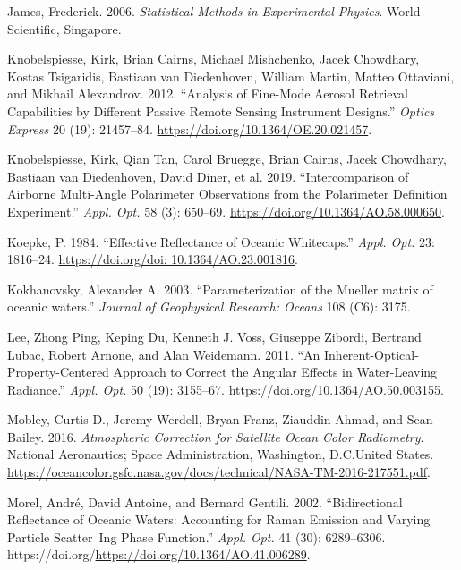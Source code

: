 \documentclass[
  letterpaper,
  open=any]{scrbook}
\newlength{\cslhangindent}
\newenvironment{CSLReferences}[2] %
 {\begin{list}{}{%
  \setlength{\itemindent}{0pt}
  \setlength{\leftmargin}{0pt}
  \setlength{\parsep}{0pt}
  \ifodd #1
   \setlength{\leftmargin}{\cslhangindent}
   \setlength{\itemindent}{-1\cslhangindent}
  \fi
  \setlength{\itemsep}{#2\baselineskip}}}
 {\end{list}}
\begin{document}
\begin{CSLReferences}{1}{0}
James, Frederick. 2006. \emph{Statistical Methods in Experimental
Physics}. World Scientific, Singapore.

Knobelspiesse, Kirk, Brian Cairns, Michael Mishchenko, Jacek Chowdhary,
Kostas Tsigaridis, Bastiaan van Diedenhoven, William Martin, Matteo
Ottaviani, and Mikhail Alexandrov. 2012. {``Analysis of Fine-Mode
Aerosol Retrieval Capabilities by Different Passive Remote Sensing
Instrument Designs.''} \emph{Optics Express} 20 (19): 21457--84.
\url{https://doi.org/10.1364/OE.20.021457}.

Knobelspiesse, Kirk, Qian Tan, Carol Bruegge, Brian Cairns, Jacek
Chowdhary, Bastiaan van Diedenhoven, David Diner, et al. 2019.
{``Intercomparison of Airborne Multi-Angle Polarimeter Observations from
the Polarimeter Definition Experiment.''} \emph{Appl. Opt.} 58 (3):
650--69. \url{https://doi.org/10.1364/AO.58.000650}.

Koepke, P. 1984. {``Effective Reflectance of Oceanic Whitecaps.''}
\emph{Appl. Opt.} 23: 1816--24.
\href{https://doi.org/doi:\%2010.1364/AO.23.001816}{https://doi.org/doi:
10.1364/AO.23.001816}.

Kokhanovsky, Alexander A. 2003. {``{Parameterization of the Mueller
matrix of oceanic waters}.''} \emph{Journal of Geophysical Research:
Oceans} 108 (C6): 3175.

Lee, Zhong Ping, Keping Du, Kenneth J. Voss, Giuseppe Zibordi, Bertrand
Lubac, Robert Arnone, and Alan Weidemann. 2011. {``An
Inherent-Optical-Property-Centered Approach to Correct the Angular
Effects in Water-Leaving Radiance.''} \emph{Appl. Opt.} 50 (19):
3155--67. \url{https://doi.org/10.1364/AO.50.003155}.

Mobley, Curtis D., Jeremy Werdell, Bryan Franz, Ziauddin Ahmad, and Sean
Bailey. 2016. \emph{Atmospheric Correction for Satellite Ocean Color
Radiometry}. National Aeronautics; Space Administration, Washington,
D.C.United States.
\url{https://oceancolor.gsfc.nasa.gov/docs/technical/NASA-TM-2016-217551.pdf}.

Morel, André, David Antoine, and Bernard Gentili. 2002. {``Bidirectional
Reflectance of Oceanic Waters: Accounting for Raman Emission and Varying
Particle Scatter~Ing Phase Function.''} \emph{Appl. Opt.} 41 (30):
6289--6306. https://doi.org/\url{https://doi.org/10.1364/AO.41.006289}.


\end{CSLReferences}
\end{document}
